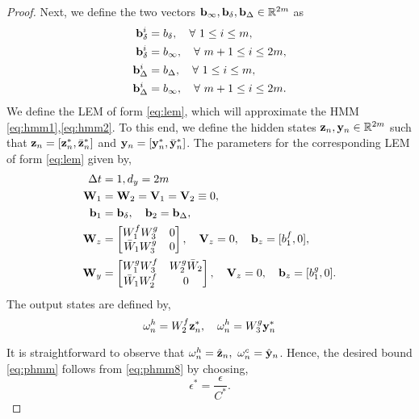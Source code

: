 \documentclass{article} \usepackage{iclr2022_conference,times}
\newcommand{\by}{{\bf y}}
\newcommand{\bz}{{\bf z}}
\newcommand{\bW}{{\bf W}}
\newcommand{\bb}{{\bf b}}
\newcommand{\bV}{{\bf V}}
\newcommand{\R}{{\mathbb R}}
\newcommand{\Dt}{{\Delta t}}
\newcommand{\bom}{{\bf \omega}}
\begin{document}
\begin{proof}
Next, we define the two vectors $\bb_{\infty},\bb_{\delta},\bb_{\Delta} \in \R^{2m}$ as
\begin{equation}
\label{eq:pf1}
\begin{aligned}
\bb_{\delta}^i &= b_{\delta}, \quad \forall~ 1 \leq i \leq m, \\
\bb_{\delta}^i &= b_{\infty}, \quad \forall~ m+1 \leq i \leq 2m, \\
\bb_{\Delta}^i &= b_{\Delta}, \quad \forall~ 1 \leq i \leq m, \\
\bb_{\Delta}^i &= b_{\infty}, \quad \forall~ m+1 \leq i \leq 2m . \\
\end{aligned}
\end{equation}
We define the LEM of form \eqref{eq:lem}, which will approximate the HMM \eqref{eq:hmm1},\eqref{eq:hmm2}. To this end, we define the hidden states $\bz_n,\by_n \in \R^{2m}$ such that $\bz_n = [\bz_n^{\ast},\bar{\bz}_n^{\ast}]$ and $\by_n = [\by_n^{\ast},\bar{\by}_n^{\ast}]$. The parameters for the corresponding LEM of form \eqref{eq:lem} given by,
\begin{equation}
    \label{eq:pf2}
    \begin{aligned}
    \Dt &= 1, d_y = 2m\\
    \bW_1 &= \bW_2 = \bV_1 = \bV_2 \equiv 0, \\
    \bb_1 &= \bb_{\delta}, \quad \bb_2 = \bb_{\Delta}, \\
    \bW_z &=\begin{bmatrix}
    W^f_1W^g_3 & 0 \\
    \bar{W}_1W^g_3 & 0 
    \end{bmatrix}, \quad \bV_z = 0, \quad \bb_z = [b^f_1,0], \\
    \bW_y &=\begin{bmatrix}
    W^g_1W^f_3 & W^g_2\bar{W}_2 \\
    \bar{W}_1W^f_2 & 0 
    \end{bmatrix}, \quad \bV_z = 0, \quad \bb_z = [b^g_1,0] . \\
    \end{aligned}
\end{equation}
The output states are defined by,
\begin{equation}
    \label{eq:pf3}
    \bom^h_n = W^f_2 \bz^{\ast}_n, \quad \bom^h_n = W^g_3 \by^{\ast}_n
\end{equation}

It is straightforward to observe that $\bom^h_n = \hat{\bz}_n,~\bom^c_n = \hat{\by}_n$. Hence, the desired bound \eqref{eq:phmm} follows from \eqref{eq:phmm8} by choosing,
$$
\epsilon^{\ast} = \frac{\epsilon}{C^{\ast}}.
$$

\end{proof}
\end{document}
